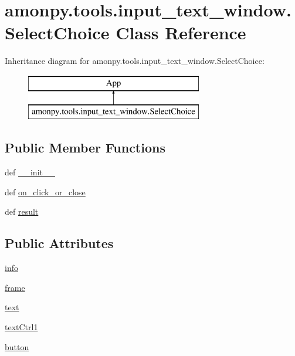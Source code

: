 \hypertarget{classamonpy_1_1tools_1_1input__text__window_1_1_select_choice}{\section{amonpy.\-tools.\-input\-\_\-text\-\_\-window.\-Select\-Choice Class Reference}
\label{classamonpy_1_1tools_1_1input__text__window_1_1_select_choice}
}
Inheritance diagram for amonpy.\-tools.\-input\-\_\-text\-\_\-window.\-Select\-Choice\-:\begin{figure}[H]
\begin{center}
\leavevmode
\includegraphics[height=2.000000cm]{d7/d1e/classamonpy_1_1tools_1_1input__text__window_1_1_select_choice}
\end{center}
\end{figure}
\subsection*{Public Member Functions}
\begin{DoxyCompactItemize}
\item 
def \hyperlink{classamonpy_1_1tools_1_1input__text__window_1_1_select_choice_aedbd4663dd0e28caf001585c390072ca}{\-\_\-\-\_\-init\-\_\-\-\_\-}
\item 
def \hyperlink{classamonpy_1_1tools_1_1input__text__window_1_1_select_choice_a46b3d909cca619c1489e4d1f4080e36a}{on\-\_\-click\-\_\-or\-\_\-close}
\item 
def \hyperlink{classamonpy_1_1tools_1_1input__text__window_1_1_select_choice_a847223a6204d1851aedcde1c2b88cccf}{result}
\end{DoxyCompactItemize}
\subsection*{Public Attributes}
\begin{DoxyCompactItemize}
\item 
\hyperlink{classamonpy_1_1tools_1_1input__text__window_1_1_select_choice_aa47ee685de6c28e23b244fdae0eaad87}{info}
\item 
\hyperlink{classamonpy_1_1tools_1_1input__text__window_1_1_select_choice_aee9b6e27856594efa52216a82b62521e}{frame}
\item 
\hyperlink{classamonpy_1_1tools_1_1input__text__window_1_1_select_choice_a6983cf49c1516c4653cad8e3663dbb38}{text}
\item 
\hyperlink{classamonpy_1_1tools_1_1input__text__window_1_1_select_choice_aab6b0771ae4ce1d7f51e5a7cd8cb3c3d}{text\-Ctrl1}
\item 
\hyperlink{classamonpy_1_1tools_1_1input__text__window_1_1_select_choice_acc99d030bfd068e7f24d6d77f5c5c767}{button}
\end{DoxyCompactItemize}


